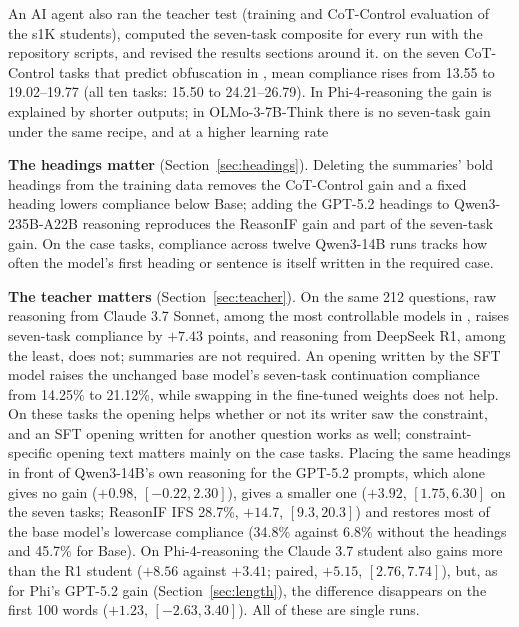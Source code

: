  An AI agent also ran the teacher test (training and CoT-Control evaluation of the s1K students), computed the seven-task composite for every run with the repository scripts, and revised the results sections around it.
on the seven CoT-Control tasks that predict obfuscation in \citet{haskins2026obfuscation}, mean compliance rises from 13.55 to 19.02--19.77 (all ten tasks: 15.50 to 24.21--26.79).
In Phi-4-reasoning the gain is explained by shorter outputs; in OLMo-3-7B-Think there is no seven-task gain under the same recipe, and at a higher learning rate
\item \textbf{The headings matter} (Section~\ref{sec:headings}). Deleting the summaries' bold headings from the training data removes the CoT-Control gain and a fixed heading lowers compliance below Base; adding the GPT-5.2 headings to Qwen3-235B-A22B reasoning reproduces the ReasonIF gain and part of the seven-task gain. On the case tasks, compliance across twelve Qwen3-14B runs tracks how often the model's first heading or sentence is itself written in the required case.
\item \textbf{The teacher matters} (Section~\ref{sec:teacher}). On the same 212 questions, raw reasoning from Claude 3.7 Sonnet, among the most controllable models in \citet{chen2026cotcontrol}, raises seven-task compliance by $+7.43$ points, and reasoning from DeepSeek R1, among the least, does not; summaries are not required.
An opening written by the SFT model raises the unchanged base model's seven-task continuation compliance from 14.25\% to 21.12\%, while swapping in the fine-tuned weights does not help. On these tasks the opening helps whether or not its writer saw the constraint, and an SFT opening written for another question works as well; constraint-specific opening text matters mainly on the case tasks.
 Placing the same headings in front of Qwen3-14B's own reasoning for the GPT-5.2 prompts, which alone gives no gain ($+0.98$, $[-0.22, 2.30]$), gives a smaller one ($+3.92$, $[1.75, 6.30]$ on the seven tasks; ReasonIF IFS 28.7\%, $+14.7$, $[9.3, 20.3]$) and restores most of the base model's lowercase compliance (34.8\% against 6.8\% without the headings and 45.7\% for Base).
On Phi-4-reasoning the Claude 3.7 student also gains more than the R1 student ($+8.56$ against $+3.41$; paired, $+5.15$, $[2.76, 7.74]$), but, as for Phi's GPT-5.2 gain (Section~\ref{sec:length}), the difference disappears on the first 100 words ($+1.23$, $[-2.63, 3.40]$). All of these are single runs.
